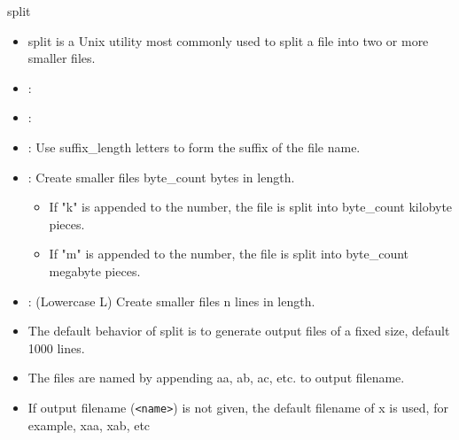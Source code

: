 \documentclass[10pt,t]{beamer}
\begin{document}
\begin{frame}[c]{split}
  \begin{itemize}
    \item split is a Unix utility most commonly used to split a file into two or more smaller files.
    \item {}: 
    \item {}:
    \item[]: Use suffix\_length letters to form the suffix of the file name.
    \item[]: Create smaller files byte\_count bytes in length.  
      \begin{itemize}
        \item[] If "k" is appended to the number, the file is split into byte\_count kilobyte pieces.  
        \item[] If "m" is appended to the number, the file is split into byte\_count megabyte pieces.
      \end{itemize}
    \item[]: (Lowercase L) Create smaller files n lines in length. 
    \item The default behavior of split is to generate output files of a fixed size, default 1000 lines. 
    \item The files are named by appending aa, ab, ac, etc. to output filename. 
    \item If output filename (\Verb|<name>|) is not given, the default filename of x is used, for example, xaa, xab, etc
  \end{itemize}
\end{frame}
\end{document}
